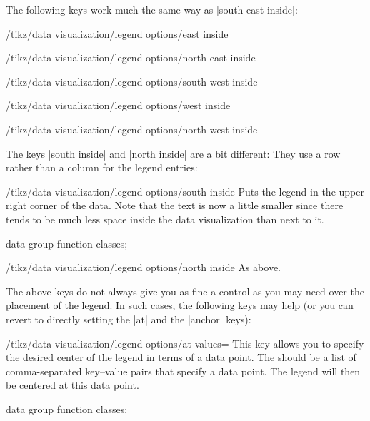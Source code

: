 The following keys work much the same way as |south east inside|:

\begin{key}{/tikz/data visualization/legend options/east inside}
\end{key}
%
\begin{key}{/tikz/data visualization/legend options/north east inside}
\end{key}
%
\begin{key}{/tikz/data visualization/legend options/south west inside}
\end{key}
%
\begin{key}{/tikz/data visualization/legend options/west inside}
\end{key}
%
\begin{key}{/tikz/data visualization/legend options/north west inside}
\end{key}

The keys |south inside| and |north inside| are a bit different: They use a row
rather than a column for the legend entries:

\begin{key}{/tikz/data visualization/legend options/south inside}
    Puts the legend in the upper right corner of the data. Note that the text
    is now a little smaller since there tends to be much less space inside the
    data visualization than next to it.
\begin{codeexample}[width=8cm]
\tikz \datavisualization [
  scientific axes,
  visualize as smooth line/.list={log, lin},
  legend=south inside,
  log=    {label in legend={text=$\log x$}},
  lin=    {label in legend={text=$x/2$}},
  style sheet=strong colors]
data group {function classes};
\end{codeexample}
\end{key}

\begin{key}{/tikz/data visualization/legend options/north inside}
    As above.
\end{key}

The above keys do not always give you as fine a control as you may need over
the placement of the legend. In such cases, the following keys may help (or you
can revert to directly setting the |at| and the |anchor| keys):

\begin{key}{/tikz/data visualization/legend options/at values=}
    This key allows you to specify the desired center of the legend in terms of
    a data point. The  should be a list of comma-separated
    key--value pairs that specify a data point. The legend will then be
    centered at this data point.
\begin{codeexample}[width=6cm]
\tikz \datavisualization [
  scientific axes,
  visualize as smooth line/.list={log, lin},
  legend={at values={x=-1, y=2}},
  log=    {label in legend={text=$\log x$}},
  lin=    {label in legend={text=$x/2$}},
  style sheet=strong colors]
data group {function classes};
\end{codeexample}
\end{key}

